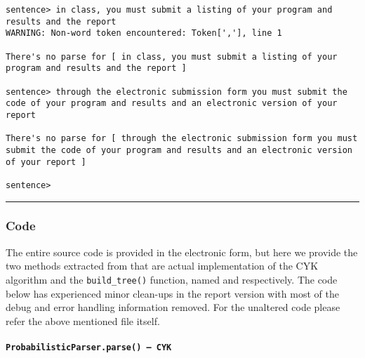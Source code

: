 \begin{verbatim}
sentence> in class, you must submit a listing of your program and results and the report
WARNING: Non-word token encountered: Token[','], line 1

There's no parse for [ in class, you must submit a listing of your program and results and the report ]

sentence> through the electronic submission form you must submit the code of your program and results and an electronic version of your report

There's no parse for [ through the electronic submission form you must submit the code of your program and results and an electronic version of your report ]

sentence>
\end{verbatim}
\vskip4pt\hrule

\normalsize


\subsubsection{Code}
\label{sect:prob-parse-code}

The entire source code is provided in the electronic form, but
here we provide the two methods extracted from
 that are actual
implementation of the CYK algorithm and the \verb+build_tree()+ function,
named  and  respectively.
The code below has experienced minor clean-ups in the report
version with most of the debug and error handling information removed. For the
unaltered code please refer the above mentioned file itself.

\paragraph{\texttt{ProbabilisticParser.parse() -- CYK}}

